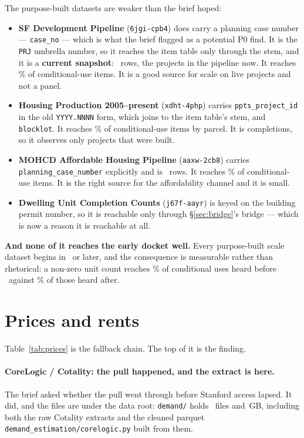 \documentclass[11pt]{article}
\begin{document}
The purpose-built datasets are weaker than the brief hoped:

\begin{itemize}
\item \textbf{SF Development Pipeline} (\texttt{6jgi-cpb4}) does carry a planning case number
--- \texttt{case\_no} --- which is what the brief flagged as a potential P0 find. It is the
\texttt{PRJ} umbrella number, so it reaches the item table only through the stem, and it is a
\textbf{current snapshot}: \acqPipelineRows\ rows, the projects in the pipeline now. It
reaches
\acqCuPipeline\% of conditional-use items. It is a good source for scale on live projects and
not a panel.
\item \textbf{Housing Production 2005--present} (\texttt{xdht-4php}) carries
\texttt{ppts\_project\_id} in the old \texttt{YYYY.NNNN} form, which joins to the item table's
stem, and \texttt{blocklot}. It reaches \acqCuHousingProd\% of conditional-use items by
parcel. It is completions, so it observes only projects that were built.
\item \textbf{MOHCD Affordable Housing Pipeline} (\texttt{aaxw-2cb8}) carries
\texttt{planning\_case\_number} explicitly and is \acqMohcdRows\ rows. It reaches
\acqCuMohcd\% of
conditional-use items. It is the right source for the affordability channel and it is small.
\item \textbf{Dwelling Unit Completion Counts} (\texttt{j67f-aayr}) is keyed on the building
permit number, so it is reachable only through \S\ref{sec:bridge}'s bridge --- which is now a
reason it is reachable at all.
\end{itemize}

\textbf{And none of it reaches the early docket well.} Every purpose-built scale dataset
begins in \acqScaleEarliest\ or later, and the consequence is measurable rather than
rhetorical: a non-zero unit count reaches \acqCuUnitsNZearly\% of conditional uses heard
before \acqScaleEarliest\ against \acqCuUnitsNZlate\% of those heard after.

\section{Prices and rents}
\label{sec:prices}

Table~\ref{tab:prices} is the fallback chain. The top of it is the finding.

\paragraph{CoreLogic / Cotality: the pull happened, and the extract is here.} The brief
asked whether the pull went through before Stanford access lapsed. It did, and the files are
under the data root: \texttt{demand/} holds \acqDemandFiles\ files and \acqDemandGB\,GB,
including both the raw Cotality extracts and the cleaned parquet
\texttt{demand\_estimation/corelogic.py} built from them.
\end{document}
